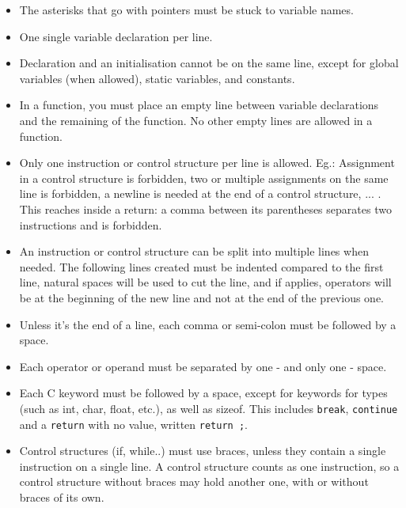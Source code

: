 \documentclass{42-en}
\begin{document}
\begin{itemize}
            \item The asterisks that go with pointers must be stuck to
              variable names.

            \item One single variable declaration per line.

            \item Declaration and an initialisation cannot be
              on the same line, except for global variables (when allowed),
              static variables, and constants.

            \item In a function, you must place an empty line between
              variable declarations and the remaining of the function.
              No other empty lines are allowed in a function.

            \item Only one instruction or control structure per line is allowed. Eg.: Assignment in
              a control structure is forbidden, two or multiple assignments on the same line is forbidden,
              a newline is needed at the end of a control structure, ... . This
              reaches inside a return: a comma between its parentheses separates
              two instructions and is forbidden.

            \item An instruction or control structure can be split into multiple lines when needed.
              The following lines created must be indented compared to the first line,
              natural spaces will be used to cut the line, and if applies, operators will be
              at the beginning of the new line and not at the end of the previous one.

            \item Unless it's the end of a line, each comma or semi-colon
              must be followed by a space.

            \item Each operator or operand must be separated by one
              - and only one - space.

            \item Each C keyword must be followed by a space, except for
              keywords for types (such as int, char, float, etc.),
              as well as sizeof. This includes \texttt{break}, \texttt{continue}
              and a \texttt{return} with no value, written \texttt{return ;}.

            \item Control structures (if, while..) must use braces, unless they contain a single
              instruction on a single line. A control structure counts as one
              instruction, so a control structure without braces may hold another
              one, with or without braces of its own.

            \end{itemize}
\end{document}
